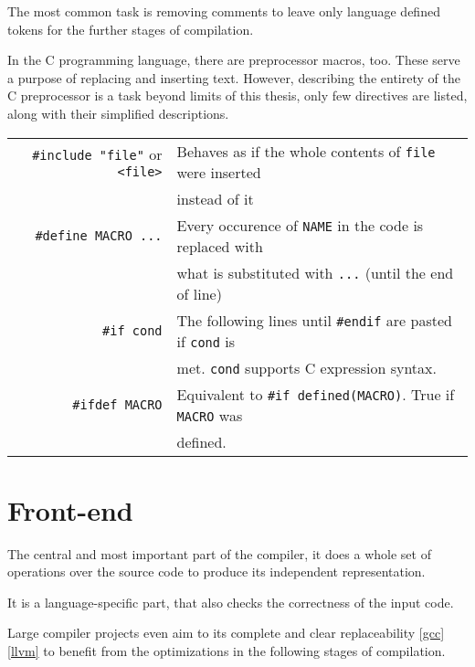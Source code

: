     The most common task is removing comments to leave only language defined tokens for the further stages of compilation.

    In the C programming language, there are preprocessor macros, too. These serve a purpose of replacing and inserting text. However, describing the entirety of the C preprocessor is a task beyond limits of this thesis, only few directives are listed, along with their simplified descriptions.

    \begin{center}\begin{tabular}{r|l}
        \verb|#include "file"| or \verb|<file>| & Behaves as if the whole contents of \verb|file| were inserted \\
        & instead of it\\
        \verb|#define MACRO ...| & Every occurence of \verb|NAME| in the code is replaced with \\
        & what is substituted with \verb|...| (until the end of line)\\
        \verb|#if cond| & The following lines until \verb|#endif| are pasted if \verb|cond| is\\
        & met. \verb|cond| supports C expression syntax.\\
        \verb|#ifdef MACRO| & Equivalent to \verb|#if defined(MACRO)|. True if \verb|MACRO| was\\
        & defined.\\
    \end{tabular}\end{center}

    \section{Front-end}

        The central and most important part of the compiler, it does a whole set of operations over the source code to produce its independent representation.

        It is a language-specific part, that also checks the correctness of the input code.

        Large compiler projects even aim to its complete and clear replaceability \ref{gcc} \ref{llvm} to benefit from the optimizations in the following stages of compilation.

